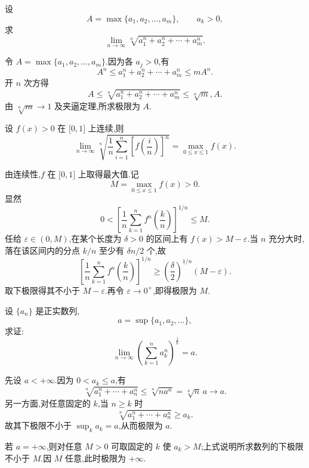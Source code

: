 \begin{example}[\markstar]
  设
  \[
    A=\max\{a_1,a_2,\ldots,a_m\},\qquad a_k>0,
  \]
  求
  \[
    \lim\limits_{n\to\infty}\sqrt[n]{a_1^n+a_2^n+\cdots+a_m^n}.
  \]
\end{example}
\exampleblank

\begin{solution}
  令 $A=\max\{a_1,a_2,\ldots,a_m\}$.因为各 $a_j>0$,有
  \[
    A^n\leq a_1^n+a_2^n+\cdots+a_m^n\leq mA^n.
  \]
  开 $n$ 次方得
  \[
    A\leq\sqrt[n]{a_1^n+a_2^n+\cdots+a_m^n}\leq\sqrt[n]{m},A.
  \]
  由 $\sqrt[n]{m}\to1$ 及夹逼定理,所求极限为 $A$.
\end{solution}

\begin{example}[\markstar]
  设 $f(x)>0$ 在 $\lbrack 0,1\rbrack$ 上连续,则
  \[
    \lim\limits_{n\to\infty}
    \sqrt[n]{\dfrac{1}{n}\sum\limits_{i=1}^n\left[f\left(\dfrac{i}{n}\right)\right]^n}
    =
    \max_{0\leq x\leq1}f(x).
  \]
\end{example}
\exampleblank

\begin{solution}
  由连续性,$f$ 在 $\lbrack0,1\rbrack$ 上取得最大值.记
  \[
    M=\max\limits_{0\leq x\leq1}f(x)>0.
  \]
  显然
  \[
    0<\left[\dfrac{1}{n}\sum\limits_{k=1}^n f^n\left(\dfrac{k}{n}\right)\right]^{1/n}
    \leq M.
  \]
  任给 $\varepsilon\in(0,M)$,在某个长度为 $\delta>0$ 的区间上有
  $f(x)>M-\varepsilon$.当 $n$ 充分大时,落在该区间内的分点 $k/n$ 至少有
  $\delta n/2$ 个,故
  \[
    \left[\dfrac{1}{n}\sum\limits_{k=1}^n f^n\left(\dfrac{k}{n}\right)\right]^{1/n}
    \geq\left(\dfrac{\delta}{2}\right)^{1/n}(M-\varepsilon).
  \]
  取下极限得其不小于 $M-\varepsilon$.再令 $\varepsilon\to0^+$,即得极限为 $M$.
\end{solution}

\begin{example}[\markstar]
  设 $\{a_n\}$ 是正实数列,
  \[
    a=\sup\{a_1,a_2,\ldots\},
  \]
  求证:
  \[
    \lim\limits_{n\to\infty}\left(\sum\limits_{k=1}^n a_k^n\right)^{\frac{1}{n}}=a.
  \]
\end{example}
\exampleblank

\begin{solution}
  先设 $a<+\infty$.因为 $0<a_k\leq a$,有
  \[
    \sqrt[n]{a_1^n+\cdots+a_n^n}\leq\sqrt[n]{na^n}=\sqrt[n]{n}\,a\longrightarrow a.
  \]
  另一方面,对任意固定的 $k$,当 $n\geq k$ 时
  \[
    \sqrt[n]{a_1^n+\cdots+a_n^n}\geq a_k.
  \]
  故其下极限不小于 $\sup_k a_k=a$,从而极限为 $a$.

  若 $a=+\infty$,则对任意 $M>0$ 可取固定的 $k$ 使 $a_k>M$;上式说明所求数列的下极限不小于
  $M$.因 $M$ 任意,此时极限为 $+\infty$.
\end{solution}

